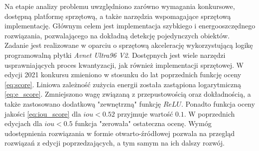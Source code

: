 Na etapie analizy problemu uwzględniono zarówno wymagania konkursowe, dostępną platformę sprzętową, a także  narzędzia wspomagające sprzętową implementację.
Głównym celem jest implementacja szybkiego i energooszczędnego rozwiązania, pozwalającego na dokładną detekcję pojedynczych obiektów. 
Zadanie jest realizowane w oparciu o sprzętową akcelerację wykorzystującą logikę programowalną płytki \emph{Avnet Ultra96 V2}.
Dostępnych jest wiele narzędzi usprawniających proces kwantyzacji, jak również implementacji sprzętowej.
W edycji 2021 konkursu zmieniono w stosunku do lat poprzednich funkcję oceny \eqref{eq:score}. Liniowa zależność zużycia energii została zastąpiona logarytmiczną \eqref{eq:e_score}. 
Zmniejszono wagę związaną z przepustowością oraz dokładnością, a także zastosowano dodatkową "zewnętrzną" funkcję $ReLU$. 
Ponadto funkcja oceny jakości \eqref{eq:iou_score} dla $iou < 0.52$ przyjmuje wartość $0.1$. 
W poprzednich edycjach dla $iou < 0.5$ funkcja "zerowała" ostateczna ocenę.   
Wymóg udostępnienia rozwiązania w formie otwarto-źródłowej pozwala na przegląd rozwiązań z edycji poprzedzających, a tym samym na ich dalszy rozwój.






    

